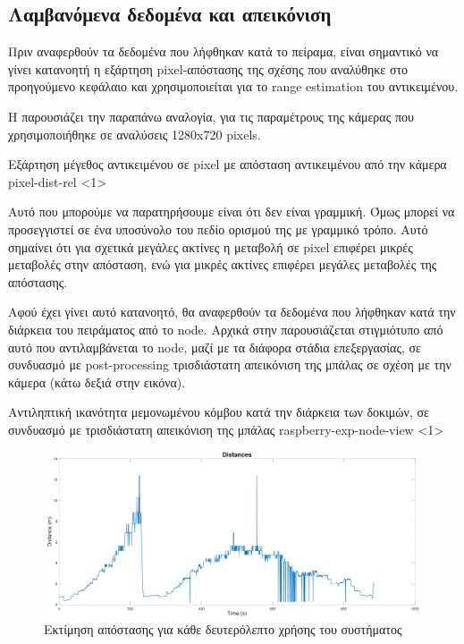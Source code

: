 \subsection{Λαμβανόμενα δεδομένα και απεικόνιση} \label{sec:expe-single-3d}

Πριν αναφερθούν τα δεδομένα που λήφθηκαν κατά το πείραμα, είναι σημαντικό να γίνει κατανοητή η εξάρτηση pixel-απόστασης της σχέσης  που αναλύθηκε στο προηγούμενο κεφάλαιο και χρησιμοποιείται για το range estimation του αντικειμένου.

Η  παρουσιάζει την παραπάνω αναλογία, για τις παραμέτρους της κάμερας που χρησιμοποιήθηκε σε αναλύσεις 1280x720 pixels.

{Εξάρτηση μέγεθος αντικειμένου σε pixel με απόσταση αντικειμένου από την κάμερα}%
{pixel-dist-rel}%
<1>

Αυτό που μπορούμε να παρατηρήσουμε είναι ότι δεν είναι γραμμική. Όμως μπορεί να προσεγγιστεί σε ένα υποσύνολο του πεδίο ορισμού της με γραμμικό τρόπο. Αυτό σημαίνει ότι για σχετικά μεγάλες ακτίνες η μεταβολή σε pixel επιφέρει μικρές με\-τα\-βο\-λές στην απόσταση, ενώ για μικρές ακτίνες επιφέρει μεγάλες μεταβολές της απόστασης. 

Αφού έχει γίνει αυτό κατανοητό, θα αναφερθούν τα δεδομένα που λήφθηκαν κατά την διάρκεια του πειράματος από το node.
Αρχικά στην  παρουσιάζεται στιγμιότυπο από αυτό που αντιλαμβάνεται 
το node, μαζί με τα διάφορα στάδια ε\-πε\-ξε\-ργα\-σίας, σε συνδυασμό με post-processing τρισδιάστατη απεικόνιση 
της μπάλας σε σχέση με την κάμερα (κάτω δεξιά στην εικόνα).

{Αντιληπτική ικανότητα μεμονωμένου κόμβου κατά την διάρκεια των δοκιμών, σε συνδυασμό με τρισδιάστατη απεικόνιση της μπάλας}%
{raspberry-exp-node-view}%
<1>



\begin{figure}[H]
  \centering
  \includegraphics[width=\linewidth]{../Images/Experiments-Results/raspberry-exp-dist.png}
  \decoRule
  \caption[Εκτίμηση απόστασης για κάθε δευτερόλεπτο χρήσης του συστήματος]{Εκτίμηση απόστασης για κάθε δευτερόλεπτο χρήσης του συστήματος}
  \label{fig:dist-experiment-example}
\end{figure}


